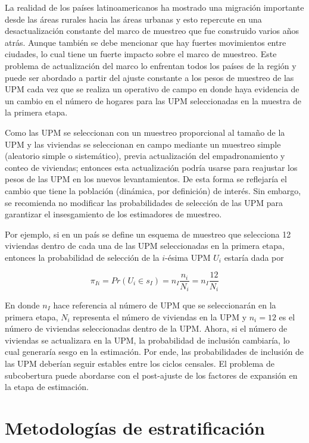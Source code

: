 \documentclass[
  12pt,
]{book}
\begin{document}
La realidad de los países latinoamericanos ha mostrado una migración importante desde las áreas rurales hacia las áreas urbanas y esto repercute en una desactualización constante del marco de muestreo que fue construido varios años atrás. Aunque también se debe mencionar que hay fuertes movimientos entre ciudades, lo cual tiene un fuerte impacto sobre el marco de muestreo. Este problema de actualización del marco lo enfrentan todos los países de la región y puede ser abordado a partir del ajuste constante a los pesos de muestreo de las UPM cada vez que se realiza un operativo de campo en donde haya evidencia de un cambio en el número de hogares para las UPM seleccionadas en la muestra de la primera etapa.

Como las UPM se seleccionan con un muestreo proporcional al tamaño de la UPM y las viviendas se seleccionan en campo mediante un muestreo simple (aleatorio simple o sistemático), previa actualización del empadronamiento y conteo de viviendas; entonces esta actualización podría usarse para reajustar los pesos de las UPM en los nuevos levantamientos. De esta forma se reflejaría el cambio que tiene la población (dinámica, por definición) de interés. Sin embargo, se recomienda no modificar las probabilidades de selección de las UPM para garantizar el insesgamiento de los estimadores de muestreo.

Por ejemplo, si en un país se define un esquema de muestreo que selecciona 12 viviendas dentro de cada una de las UPM seleccionadas en la primera etapa, entonces la probabilidad de selección de la \(i\)-ésima UPM \(U_i\) estaría dada por

\[
\pi_{Ii}=Pr(U_i \in s_I)=n_I\frac{n_i}{N_i}=n_I\frac{12}{N_i}
\]

En donde \(n_I\) hace referencia al número de UPM que se seleccionarán en la primera etapa, \(N_i\) representa el número de viviendas en la UPM y \(n_i=12\) es el número de viviendas seleccionadas dentro de la UPM. Ahora, si el número de viviendas se actualizara en la UPM, la probabilidad de inclusión cambiaría, lo cual generaría sesgo en la estimación. Por ende, las probabilidades de inclusión de las UPM deberían seguir estables entre los ciclos censales. El problema de subcobertura puede abordarse con el post-ajuste de los factores de expansión en la etapa de estimación.

\hypertarget{metodologuxedas-de-estratificaciuxf3n}{%
\chapter{Metodologías de estratificación}\label{metodologuxedas-de-estratificaciuxf3n}}
\end{document}
